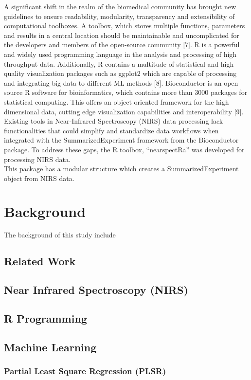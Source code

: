 \documentclass[12pt,a4paper]{report}
\begin{document}
A significant  shift in the realm of the biomedical community has brought new guidelines to ensure readability, modularity, transparency and extensibility of computational toolboxes. A toolbox, which stores multiple functions, parameters and results in a central location should be maintainable and uncomplicated for the developers and members of the open-source community [7].
R is a powerful and widely used programming language in the analysis and processing of high throughput data. Additionally, R contains a multitude of statistical and high quality visualization packages such as ggplot2 which are capable of processing and integrating big data to different ML methods [8]. Bioconductor is an open source R software for bioinformatics, which contains more than 3000 packages for statistical computing. 
This offers an object oriented framework for the high dimensional data, cutting edge visualization capabilities and interoperability [9]. Existing tools in Near-Infrared Spectroscopy (NIRS) data processing lack functionalities that could simplify and standardize data workflows when integrated with the SummarizedExperiment framework from the Bioconductor package. To address these gaps, the R toolbox, “nearspectRa” was developed for processing NIRS data. \\
This package has a modular structure which creates a SummarizedExperiment object from NIRS data.






\chapter{Background}
The background of this study include
\section{Related Work}
\section{Near Infrared Spectroscopy (NIRS)}
\section{R Programming}
\section{Machine Learning}
\subsection{Partial Least Square Regression (PLSR)}
\end{document}
